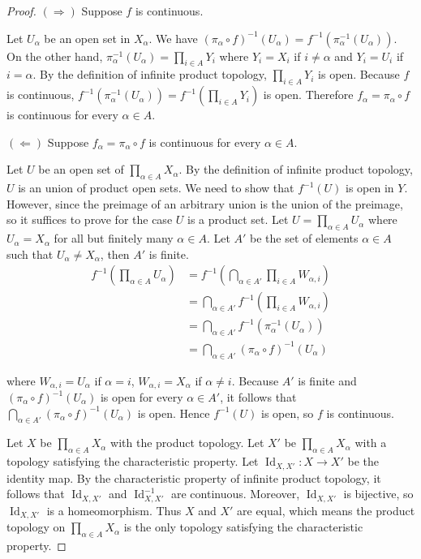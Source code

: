 \begin{proof}
	$(\Longrightarrow)$ Suppose $f$ is continuous.

	Let $U_{\alpha}$ be an open set in $X_{\alpha}$. We have ${(\pi_{\alpha}\circ f)}^{-1}(U_{\alpha}) = f^{-1}(\pi_{\alpha}^{-1}(U_{\alpha}))$. On the other hand, $\pi_{\alpha}^{-1}(U_{\alpha}) = \prod_{i\in A}Y_{i}$ where $Y_{i} = X_{i}$ if $i\ne\alpha$ and $Y_{i} = U_{i}$ if $i = \alpha$. By the definition of infinite product topology, $\prod_{i\in A}Y_{i}$ is open. Because $f$ is continuous, $f^{-1}(\pi_{\alpha}^{-1}(U_{\alpha})) = f^{-1}\left(\prod_{i\in A}Y_{i}\right)$ is open. Therefore $f_{\alpha} = \pi_{\alpha}\circ f$ is continuous for every $\alpha\in A$.

	$(\Longleftarrow)$ Suppose $f_{\alpha} = \pi_{\alpha}\circ f$ is continuous for every $\alpha\in A$.

	Let $U$ be an open set of $\prod_{\alpha\in A}X_{\alpha}$. By the definition of infinite product topology, $U$ is an union of product open sets. We need to show that $f^{-1}(U)$ is open in $Y$. However, since the preimage of an arbitrary union is the union of the preimage, so it suffices to prove for the case $U$ is a product set. Let $U = \prod_{\alpha\in A}U_{\alpha}$ where $U_{\alpha} = X_{\alpha}$ for all but finitely many $\alpha\in A$. Let $A'$ be the set of elements $\alpha\in A$ such that $U_{\alpha}\ne X_{\alpha}$, then $A'$ is finite.
	\begin{align*}
		f^{-1}\left(\prod_{\alpha\in A}U_{\alpha}\right) & = f^{-1}\left(\bigcap_{\alpha\in A'}\prod_{i\in A}W_{\alpha, i}\right) \\
		                                                 & = \bigcap_{\alpha\in A'}f^{-1}\left(\prod_{i\in A}W_{\alpha,i}\right)  \\
		                                                 & = \bigcap_{\alpha\in A'}f^{-1}(\pi_{\alpha}^{-1}(U_{\alpha}))          \\
		                                                 & = \bigcap_{\alpha\in A'}{(\pi_{\alpha}\circ f)}^{-1}(U_{\alpha})
	\end{align*}

	where $W_{\alpha, i} = U_{\alpha}$ if $\alpha = i$, $W_{\alpha, i} = X_{\alpha}$ if $\alpha\ne i$. Because $A'$ is finite and ${(\pi_{\alpha}\circ f)}^{-1}(U_{\alpha})$ is open for every $\alpha\in A'$, it follows that $\bigcap_{\alpha\in A'}{(\pi_{\alpha}\circ f)}^{-1}(U_{\alpha})$ is open. Hence $f^{-1}(U)$ is open, so $f$ is continuous.

	\bigskip
	Let $X$ be $\prod_{\alpha\in A}X_{\alpha}$ with the product topology. Let $X'$ be $\prod_{\alpha\in A}X_{\alpha}$ with a topology satisfying the characteristic property. Let $\operatorname{Id}_{X,X'}: X\to X'$ be the identity map. By the characteristic property of infinite product topology, it follows that $\operatorname{Id}_{X,X'}$ and $\operatorname{Id}_{X,X'}^{-1}$ are continuous. Moreover, $\operatorname{Id}_{X,X'}$ is bijective, so $\operatorname{Id}_{X,X'}$ is a homeomorphism. Thus $X$ and $X'$ are equal, which means the product topology on $\prod_{\alpha\in A}X_{\alpha}$ is the only topology satisfying the characteristic property.
\end{proof}

